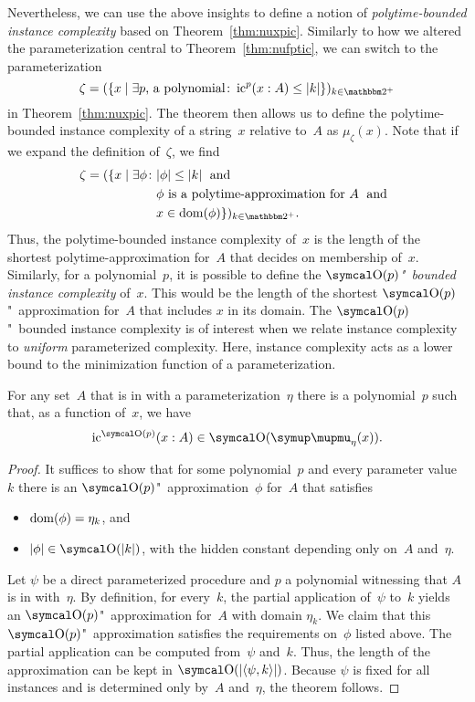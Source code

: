 Nevertheless, we can use the above insights to define a notion of \emph{polytime-bounded instance complexity} based on Theorem~\ref{thm:nuxpic}.
Similarly to how we altered the parameterization central to Theorem~\ref{thm:nufptic}, we can switch to the parameterization
\begin{equation*}
  \zeta \deq (\{x \st \exists p\text{, a polynomial}\colon \ic^p(x : A) \le \length{k}\})_{k \in \binary^+}
\end{equation*}
in Theorem~\ref{thm:nuxpic}.
The theorem then allows us to define the polytime-bounded instance complexity of a string~$x$ relative to~$A$ as $\mu_\zeta(x)$.
Note that if we expand the definition of~$\zeta$, we find
\begin{align*}
  \zeta = (\{x \st \exists \phi\colon &\length{\phi} \le \length{k} \reland \\
  	&\text{$\phi$ is a polytime-approximation for $A$} \reland \\
  	&x \in \dom(\phi)\})_{k \in \binary^+}.
\end{align*}
Thus, the polytime-bounded instance complexity of~$x$ is the length of the shortest polytime-approximation for~$A$ that decides on membership of~$x$.
Similarly, for a polynomial~$p$, it is possible to define the \emph{$\bigO(p)$"~bounded instance complexity} of~$x$.
This would be the length of the shortest $\bigO(p)$"~approximation for~$A$ that includes $x$ in its domain.
The $\bigO(p)$"~bounded instance complexity is of interest when we relate instance complexity to \emph{uniform} parameterized complexity.
Here, instance complexity acts as a lower bound to the minimization function of a parameterization.
\begin{theorem}
\label{thm:fptic}%
  For any set~$A$ that is in  with a parameterization~$\eta$ there is a polynomial~$p$ such that, as a function of~$x$, we have
  \begin{equation*}
    \ic^{\bigO(p)}(x : A) \in \bigO(\mu_\eta(x)).
  \end{equation*}
\end{theorem}
\begin{proof}
  It suffices to show that for some polynomial~$p$ and every parameter value~$k$ there is an $\bigO(p)$"~approximation~$\phi$ for~$A$ that satisfies
  \begin{itemize}
  \item $\operatorname{dom}(\phi) = \eta_k$, and
  \item $\length{\phi} \in \bigO(\length{k})$, with the hidden constant depending only on~$A$ and~$\eta$.
  \end{itemize}
  Let $\psi$ be a direct parameterized procedure and $p$ a polynomial witnessing that $A$ is in  with~$\eta$.
  By definition, for every~$k$, the partial application of~$\psi$ to~$k$ yields an $\bigO(p)$"~approximation for~$A$ with domain $\eta_k$.
  We claim that this $\bigO(p)$"~approximation satisfies the requirements on~$\phi$ listed above.
  The partial application can be computed from~$\psi$ and~$k$.
  Thus, the length of the approximation can be kept in $\bigO(\length{\pair{\psi}{k}})$.
  Because $\psi$ is fixed for all instances and is determined only by~$A$ and~$\eta$, the theorem follows.
\end{proof}

